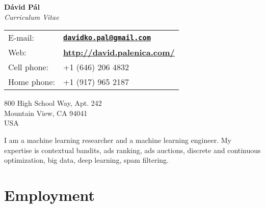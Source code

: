 \documentclass[9pt]{article}
\begin{document}
\begin{center}
{\huge \textbf{D\'avid P\'al}} \\[0.2cm]
\emph{Curriculum Vitae}
\end{center}

\vspace{0.2cm}

%
\noindent
%
\begin{minipage}{10cm}
\begin{tabular}{@{}ll}
E-mail:      & \href{mailto:davidko.pal@gmail.com}{\textbf{\texttt{davidko.pal@gmail.com}}} \\[0.1cm]
Web:         & \textbf{\url{http://david.palenica.com/}} \\[0.1cm]
Cell phone:  & +1 (646) 206 4832 \\[0.1cm]
Home phone:  & +1 (917) 965 2187 \\[0.1cm]
\end{tabular}
\end{minipage}
%
\begin{minipage}{10cm}
800 High School Way, Apt. 242 \\
Mountain View, CA 94041 \\
USA \\
\end{minipage}


\vspace{0.3cm}

\noindent I am a machine learning researcher and a machine learning engineer.
My expertise is contextual bandits, ads ranking, ads auctions, discrete and
continuous optimization, big data, deep learning, spam filtering.

\section*{Employment}
\end{document}
